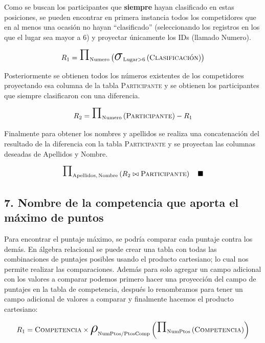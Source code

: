 \documentclass[a4paper, twoside, 12pt]{article}
\newcommand{\tblstr}[1]{\mathrm{\textsc{#1}}}
\newcommand{\select}[4]{\makebox{\huge\ensuremath{\sigma}}_{\mathrm{#1} #2 #3}\left( #4 \right)}
\newcommand{\project}[2]{\makebox{\huge\ensuremath{\Pi}}_{\mathrm{#1}} \left( #2 \right)}
\newcommand{\rename}[3]{\makebox{\huge\ensuremath{\rho}}_{\mathrm{#1} / \mathrm{#2} } \left( #3 \right)}
\begin{document}
Como se buscan los participantes que \textbf{siempre} hayan clasificado en estas posiciones, se pueden encontrar en primera instancia todos los competidores que en al menos una ocasión no hayan ``clasificado'' (seleccionando los registros en los que el lugar sea mayor a 6) y proyectar únicamente los IDs (llamado Numero).

\begin{equation*}
    R_1 = \project
            {\mathrm{Numero}}
            {\select
                {Lugar}
                {>}
                {6}
                {\tblstr{Clasificación}}}
\end{equation*}

Posteriormente se obtienen todos los números existentes de los competidores proyectando esa columna de la tabla \textsc{Participante} y se obtienen los participantes que siempre clasificaron con una diferencia. 

\begin{equation*}
    R_2 = \project
            {\mathrm{Numero}}
            {\tblstr{Participante}}
        - R_1
\end{equation*}

Finalmente para obtener los nombres y apellidos se realiza una concatenación del resultado de la diferencia con la tabla \textsc{Participante} y se proyectan las columnas deseadas de Apellidos y Nombre.

\begin{equation*}
    \project
        {\mathrm{Apellidos,\, Nombre}}
        {R_2 \bowtie {\tblstr{Participante}}}   \quad   \blacksquare
\end{equation*}

\subsection*{7. Nombre de la competencia que aporta el máximo de puntos}
Para encontrar el puntaje máximo, se podría comparar cada puntaje contra los demás. En álgebra relacional se puede crear una tabla con todas las combinaciones de puntajes posibles usando el producto cartesiano; lo cual nos permite realizar las comparaciones. Además para solo agregar un campo adicional con los valores a comparar podemos primero hacer una proyección del campo de puntajes en la tabla de competencia, después lo renombramos para tener un campo adicional de valores a comparar y finalmente hacemos el producto cartesiano:

\begin{equation*}
    R_{1} = \tblstr{Competencia}
        \times
    \rename
        {NumPtos}
        {PtosComp}
        {\project
            {NumPtos}
            {\tblstr{Competencia}}}
\end{equation*}
\end{document}
